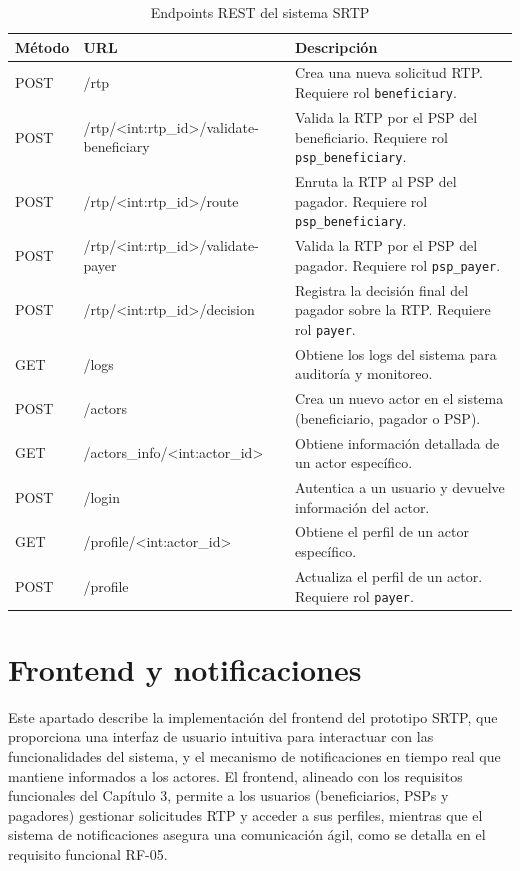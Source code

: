 \begin{table}[H]
    \centering
    \caption{Endpoints REST del sistema SRTP}
    \label{tab:endpoints}
    \begin{tabular}{@{}p{2cm}p{5cm}p{7cm}@{}}
        \toprule
        \textbf{Método} & \textbf{URL} & \textbf{Descripción} \\
        \midrule
        POST & /rtp & Crea una nueva solicitud RTP. Requiere rol \texttt{beneficiary}. \\
        POST & /rtp/\textless int:rtp\_id\textgreater /validate-beneficiary & Valida la RTP por el PSP del beneficiario. Requiere rol \texttt{psp\_beneficiary}. \\
        POST & /rtp/\textless int:rtp\_id\textgreater /route & Enruta la RTP al PSP del pagador. Requiere rol \texttt{psp\_beneficiary}. \\
        POST & /rtp/\textless int:rtp\_id\textgreater /validate-payer & Valida la RTP por el PSP del pagador. Requiere rol \texttt{psp\_payer}. \\
        POST & /rtp/\textless int:rtp\_id\textgreater /decision & Registra la decisión final del pagador sobre la RTP. Requiere rol \texttt{payer}. \\
        GET & /logs & Obtiene los logs del sistema para auditoría y monitoreo. \\
        POST & /actors & Crea un nuevo actor en el sistema (beneficiario, pagador o PSP). \\
        GET & /actors\_info/\textless int:actor\_id\textgreater & Obtiene información detallada de un actor específico. \\
        POST & /login & Autentica a un usuario y devuelve información del actor. \\
        GET & /profile/\textless int:actor\_id\textgreater & Obtiene el perfil de un actor específico. \\
        POST & /profile & Actualiza el perfil de un actor. Requiere rol \texttt{payer}. \\
        \bottomrule
    \end{tabular}
\end{table}


\section{Frontend y notificaciones}
\label{subsec:frontend}

Este apartado describe la implementación del frontend del prototipo SRTP, que proporciona una interfaz de usuario intuitiva para interactuar con las funcionalidades del sistema, y el mecanismo de notificaciones en tiempo real que mantiene informados a los actores. El frontend, alineado con los requisitos funcionales del Capítulo 3, permite a los usuarios (beneficiarios, PSPs y pagadores) gestionar solicitudes RTP y acceder a sus perfiles, mientras que el sistema de notificaciones asegura una comunicación ágil, como se detalla en el requisito funcional RF-05.

